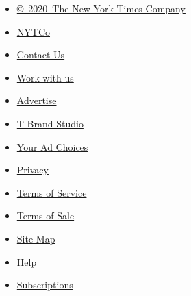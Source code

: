 \begin{itemize}
\tightlist
\item
  \href{https://help.nytimes3xbfgragh.onion/hc/en-us/articles/115014792127-Copyright-notice}{©~2020~The
  New York Times Company}
\end{itemize}

\begin{itemize}
\tightlist
\item
  \href{https://www.nytco.com/}{NYTCo}
\item
  \href{https://help.nytimes3xbfgragh.onion/hc/en-us/articles/115015385887-Contact-Us}{Contact
  Us}
\item
  \href{https://www.nytco.com/careers/}{Work with us}
\item
  \href{https://nytmediakit.com/}{Advertise}
\item
  \href{http://www.tbrandstudio.com/}{T Brand Studio}
\item
  \href{https://www.nytimes3xbfgragh.onion/privacy/cookie-policy\#how-do-i-manage-trackers}{Your
  Ad Choices}
\item
  \href{https://www.nytimes3xbfgragh.onion/privacy}{Privacy}
\item
  \href{https://help.nytimes3xbfgragh.onion/hc/en-us/articles/115014893428-Terms-of-service}{Terms
  of Service}
\item
  \href{https://help.nytimes3xbfgragh.onion/hc/en-us/articles/115014893968-Terms-of-sale}{Terms
  of Sale}
\item
  \href{https://spiderbites.nytimes3xbfgragh.onion}{Site Map}
\item
  \href{https://help.nytimes3xbfgragh.onion/hc/en-us}{Help}
\item
  \href{https://www.nytimes3xbfgragh.onion/subscription?campaignId=37WXW}{Subscriptions}
\end{itemize}
